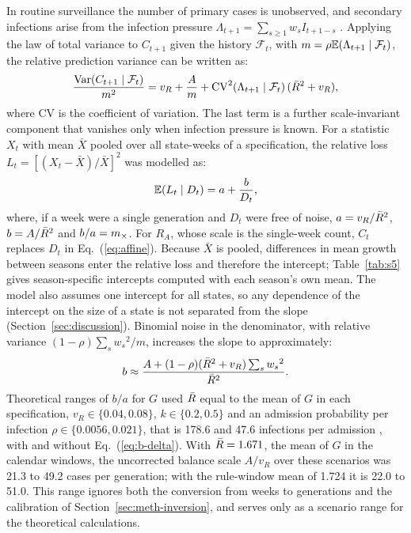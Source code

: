 In routine surveillance the number of primary cases is unobserved, and secondary infections arise from the infection pressure $\Lambda_{t+1}=\sum_{s\ge1}w_sI_{t+1-s}$ \citep{fraser2007estimating, cori2013new}. Applying the law of total variance to $C_{t+1}$ given the history $\mathcal{F}_t$, with $m=\rho\mathbb{E}(\Lambda_{t+1}\mid\mathcal{F}_t)$, the relative prediction variance can be written as:
\begin{equation}
  \frac{\mathrm{Var}(C_{t+1}\mid\mathcal{F}_t)}{m^2}=v_R+\frac{A}{m}+\mathrm{CV}^2(\Lambda_{t+1}\mid\mathcal{F}_t)\,(\bar{R}^2+v_R),
  \label{eq:info-decomp}
\end{equation}
where $\mathrm{CV}$ is the coefficient of variation. The last term is a further scale-invariant component that vanishes only when infection pressure is known. For a statistic $X_t$ with mean $\bar{X}$ pooled over all state-weeks of a specification, the relative loss $L_t=[(X_t-\bar{X})/\bar{X}]^2$ was modelled as:
\begin{equation}
  \mathbb{E}(L_t\mid D_t)=a+\frac{b}{D_t},
  \label{eq:affine}
\end{equation}
where, if a week were a single generation and $D_t$ were free of noise, $a=v_R/\bar{R}^2$, $b=A/\bar{R}^2$ and $b/a=m_{\times}$. For $R_A$, whose scale is the single-week count, $C_t$ replaces $D_t$ in Eq.~(\ref{eq:affine}). Because $\bar{X}$ is pooled, differences in mean growth between seasons enter the relative loss and therefore the intercept; Table~\ref{tab:s5} gives season-specific intercepts computed with each season's own mean. The model also assumes one intercept for all states, so any dependence of the intercept on the size of a state is not separated from the slope (Section~\ref{sec:discussion}). Binomial noise in the denominator, with relative variance $(1-\rho)\sum_sw_s{}^2/m$, increases the slope to approximately:
\begin{equation}
  b\approx\frac{A+(1-\rho)(\bar{R}^2+v_R)\sum_sw_s{}^2}{\bar{R}^2}.
  \label{eq:b-delta}
\end{equation}
Theoretical ranges of $b/a$ for $G$ used $\bar{R}$ equal to the mean of $G$ in each specification, $v_R\in\{0.04,0.08\}$, $k\in\{0.2,0.5\}$ \citep{lloydsmith2005superspreading} and an admission probability per infection $\rho\in\{0.0056,0.021\}$, that is 178.6 and 47.6 infections per admission \citep{tokars2018seasonal}, with and without Eq.~(\ref{eq:b-delta}). With $\bar{R}=1.671$, the mean of $G$ in the calendar windows, the uncorrected balance scale $A/v_R$ over these scenarios was 21.3 to 49.2 cases per generation; with the rule-window mean of 1.724 it is 22.0 to 51.0. This range ignores both the conversion from weeks to generations and the calibration of Section~\ref{sec:meth-inversion}, and serves only as a scenario range for the theoretical calculations.

